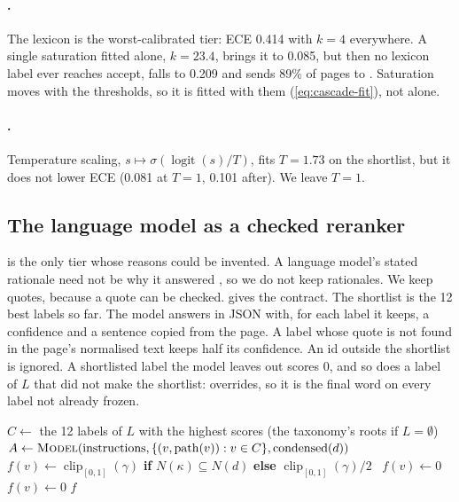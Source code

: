 \paragraph{.} The lexicon is the worst-calibrated tier: ECE 0.414 with $k = 4$ everywhere. A single saturation fitted alone, $k = 23.4$, brings it to 0.085, but then no lexicon label ever reaches accept,  falls to \hF{} 0.209 and sends 89\% of pages to . Saturation moves with the thresholds, so it is fitted with them (\cref{eq:cascade-fit}), not alone.

\paragraph{.} Temperature scaling, $s \mapsto \sigma(\operatorname{logit}(s)/T)$, fits $T = 1.73$ on the shortlist, but it does not lower ECE (0.081 at $T=1$, 0.101 after). We leave $T = 1$.

\subsection{The language model as a checked reranker}\label{sec:cascade-t4}

 is the only tier whose reasons could be invented. A language model's stated rationale need not be why it answered \citep{turpin2023language}, so we do not keep rationales. We keep quotes, because a quote can be checked.  gives the contract. The shortlist is the 12 best labels so far. The model answers in JSON with, for each label it keeps, a confidence and a sentence copied from the page. A label whose quote is not found in the page's normalised text keeps half its confidence. An id outside the shortlist is ignored. A shortlisted label the model leaves out scores 0, and so does a label of $L$ that did not make the shortlist:  overrides, so it is the final word on every label not already frozen.

\begin{algorithm}[t]
\caption{: rerank a shortlist and check every quote. $N(\cdot)$ is the text normaliser the lexicon uses.}
\label{alg:cascade-t4}
\begin{algorithmic}[1]
  \State $C \gets$ the 12 labels of $L$ with the highest scores (the taxonomy's roots if $L = \emptyset$)
  \State $A \gets \textsc{Model}(\text{instructions}, \{(v, \operatorname{path}(v)) : v \in C\}, \operatorname{condensed}(d))$ 
      \State $f(v) \gets \operatorname{clip}_{[0,1]}(\gamma)$ \textbf{if} $N(\kappa) \subseteq N(d)$ \textbf{else} $\operatorname{clip}_{[0,1]}(\gamma)/2$
    \Else\ $f(v) \gets 0$ 
    \EndIf
  \EndFor
   $f(v) \gets 0$  \EndFor
  \State \Return $f$ 
\EndFunction
\end{algorithmic}
\end{algorithm}

